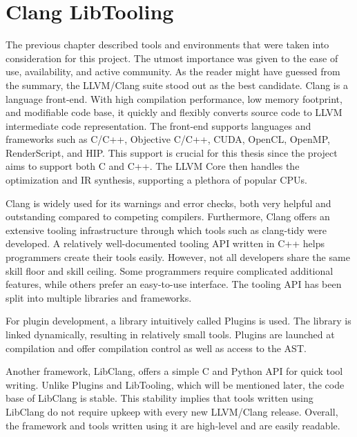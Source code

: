 \chapter{Clang LibTooling}

The previous chapter described tools and environments that were taken
into consideration for this project. 
The utmost importance was given to the ease of use, availability, and 
active community. 
As the reader might have guessed from the summary, the LLVM/Clang 
suite stood out as the best candidate.
Clang is a language front-end. With high compilation performance, 
low memory footprint, and modifiable code base, it quickly and flexibly 
converts source code to LLVM intermediate code representation. 
The front-end supports languages and frameworks such as C/C++, 
Objective C/C++, CUDA, OpenCL, OpenMP, RenderScript, and HIP. 
This support is crucial for this thesis since the project 
aims to support both C and C++. 
The LLVM Core then handles the optimization and IR synthesis, 
supporting a plethora of popular CPUs.

Clang is widely used for its warnings and error checks, both very 
helpful and outstanding compared to competing compilers. 
Furthermore, Clang offers an extensive tooling infrastructure 
through which tools such as clang-tidy were developed. 
A relatively well-documented tooling API written in C++ helps 
programmers create their tools easily. 
However, not all developers share the same skill floor and skill ceiling. 
Some programmers require complicated additional features, while others 
prefer an easy-to-use interface. 
The tooling API has been split into multiple libraries and frameworks. 

For plugin development, a library intuitively called Plugins is used. 
The library is linked dynamically, resulting in relatively small tools. 
Plugins are launched at compilation and offer compilation control 
as well as access to the AST. 

Another framework, LibClang, offers a simple C and Python API for quick 
tool writing. 
Unlike Plugins and LibTooling, which will be mentioned later, the code 
base of LibClang is stable. 
This stability implies that tools written using LibClang do not require
upkeep with every new LLVM/Clang release. 
Overall, the framework and tools written using it are high-level and 
are easily readable.

